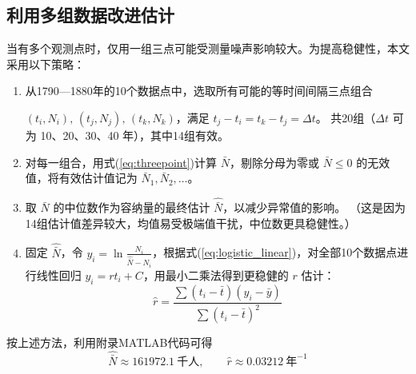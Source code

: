 \subsection{利用多组数据改进估计}
当有多个观测点时，仅用一组三点可能受测量噪声影响较大。为提高稳健性，本文采用以下策略：
\begin{enumerate}
    \item 从1790—1880年的10个数据点中，选取所有可能的等时间间隔三点组合

    $(t_i,N_i),\,(t_j,N_j),\,(t_k,N_k)$，满足 $t_j-t_i=t_k-t_j=\Delta t$。
    共20组（$\Delta t$ 可为 10、20、30、40 年），其中14组有效。
    \item 对每一组合，用式(\ref{eq:threepoint})计算 $\bar{N}$，剔除分母为零或 $\bar{N}\le 0$ 的无效值，将有效估计值记为 $\bar{N}_1,\bar{N}_2,\dots$。
    \item 取 $\bar{N}$ 的中位数作为容纳量的最终估计 $\hat{\bar{N}}$，以减少异常值的影响。
    （这是因为14组估计值差异较大，均值易受极端值干扰，中位数更具稳健性。）
    \item 固定 $\hat{\bar{N}}$，令 $y_i=\ln\frac{N_i}{\hat{\bar{N}}-N_i}$，根据式(\ref{eq:logistic_linear})，对全部10个数据点进行线性回归 $y_i=rt_i+C$，用最小二乘法得到更稳健的 $r$ 估计：
    \begin{equation}
        \hat{r}=\frac{\sum(t_i-\bar{t})(y_i-\bar{y})}{\sum(t_i-\bar{t})^2}
    \end{equation}
\end{enumerate}

按上述方法，利用附录MATLAB代码可得
\[
\hat{\bar{N}}\approx 161972.1\ \text{千人},\qquad
\hat{r}\approx 0.03212\ \text{年}^{-1}
\]

